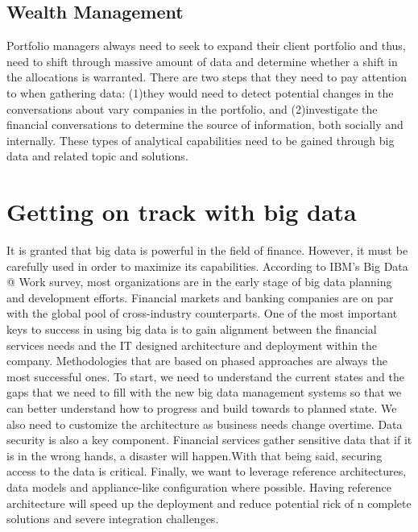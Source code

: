 \documentclass[sigconf]{acmart}
\begin{document}
\subsection{Wealth Management}
Portfolio managers always need to seek to expand their client portfolio and thus, need to shift through massive amount of data and determine whether a shift in the allocations is warranted. There are two steps that they need to pay attention to when gathering data: (1)they would need to detect potential changes in the conversations about vary companies in the portfolio, and (2)investigate the financial conversations to determine the source of information, both socially and internally. These types of analytical capabilities need to be gained through big data and related topic and solutions.\cite{Brett2012}

\section{Getting on track with big data}
It is granted that big data is powerful in the field of finance. However, it must be carefully used in order to maximize its capabilities. According to IBM's Big Data @ Work survey, most organizations are in the early stage of big data planning and development efforts. Financial markets and banking companies are on par with the global pool of cross-industry counterparts.\cite{Turner2013} One of the most important keys to success in using big data is to gain alignment between the financial services needs and the IT designed architecture and deployment within the company. Methodologies that are based on phased approaches are always the most successful ones. To start, we need to understand the current states and the gaps that we need to fill with the new big data management systems so that we can better understand how to progress and build towards to planned state. We also need to customize the architecture as business needs change overtime.\cite{Brett2012} Data security is also a key component. Financial services gather sensitive data that if it is in the wrong hands, a disaster will happen.With that being said, securing access to the data is critical. Finally, we want to leverage reference architectures, data models and appliance-like configuration where possible. \cite{Turner2013} Having reference architecture will speed up the deployment and reduce potential rick of n complete solutions and severe integration challenges.
\end{document}
